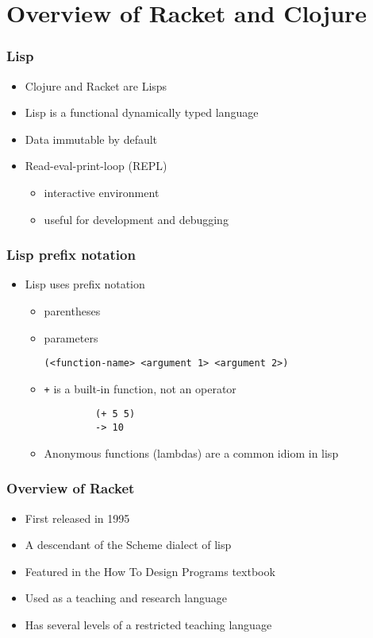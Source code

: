 \documentclass{beamer}
\begin{document}
\section{Overview of Racket and Clojure}

\begin{frame}
\frametitle{Lisp}
	\begin{itemize}
		\item Clojure and Racket are Lisps
		\item Lisp is a functional dynamically typed language
		\item Data immutable by default
  			\item Read-eval-print-loop (REPL)
  	 		\begin{itemize}
  	 		\item interactive environment
  	 		\item useful for development and debugging
  	 	\end{itemize}
	\end{itemize}
\end{frame}

\begin{frame}[fragile]
\frametitle{Lisp prefix notation}
	\begin{itemize}
  	  \item Lisp uses prefix notation
  	  \begin{itemize}
  	 	 \item parentheses
  	 	 \item parameters
  	 	 
  	 	 \texttt{(<function-name> <argument 1> <argument 2>)}
  	 	 \item \texttt{+} is a built-in function, not an operator
  	 	 \begin{verbatim}		
		 (+ 5 5)
		 -> 10
	     \end{verbatim}
		\item Anonymous functions (lambdas) are a common idiom in lisp
		
	  \end{itemize}
   \end{itemize}
\end{frame}

\begin{frame}
\frametitle{Overview of Racket}
	\begin{itemize}
		\item First released in 1995
		\item A descendant of the Scheme dialect of lisp
		\item Featured in the How To Design Programs textbook
		\item Used as a teaching and research language
		\item Has several levels of a restricted teaching language
	\end{itemize}
\end{frame}
\end{document}
